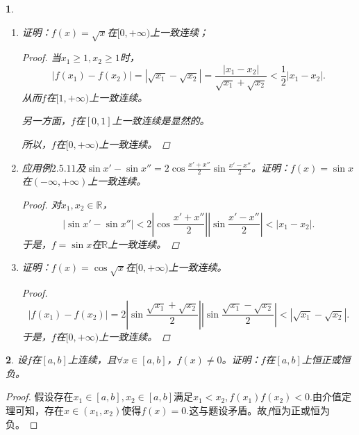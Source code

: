 \documentclass[utf8]{book}
\newtheorem{example}{}[section]             %
\begin{document}
\begin{example}
\renewcommand\labelenumi{\normalfont(\theenumi)}
\begin{enumerate}
\item 证明：$f(x)=\sqrt{x}$在$[0,+\infty)$上一致连续；
\begin{proof}
当$x_1 \geq 1, x_2 \geq 1$时，
$$|f(x_1)-f(x_2)| = |\sqrt{x_1}-\sqrt{x_2}|=\frac{|x_1-x_2|}{\sqrt{x_1}+\sqrt{x_2}} < \frac{1}{2}|x_1-x_2|.$$
从而$f$在$[1, +\infty)$上一致连续。

另一方面，$f$在$[0,1]$上一致连续是显然的。

所以，$f$在$[0,+\infty)$上一致连续。
\end{proof}
\item 应用例$2.5.11$及$\sin{x'}-\sin{x''}=2\cos{\frac{x'+x''}{2}}\sin{\frac{x'-x''}{2}}$。证明：$f(x)=\sin{x}$在$(-\infty,+\infty)$上一致连续。
\begin{proof}
对$x_1, x_2\in \mathbb{R}$，$$|\sin{x'}-\sin{x''}| < 2|\cos{\frac{x'+x''}{2}}||\sin{\frac{x'-x''}{2}}| < |x_1-x_2|.$$
于是，$f=\sin{x}$在$\mathbb{R}$上一致连续。
\end{proof}
\item 证明：$f(x)=\cos{\sqrt{x}}$在$[0,+\infty)$上一致连续。
\begin{proof}
$$|f(x_1) - f(x_2)|= 2|\sin{\frac{\sqrt{x_1}+\sqrt{x_2}}{2}}||\sin{\frac{\sqrt{x_1}-\sqrt{x_2}}{2}}| < |\sqrt{x_1}-\sqrt{x_2}|.$$
于是，$f$在$[0, +\infty)$上一致连续。
\end{proof}
\end{enumerate}
\end{example}
\begin{example}
设$f$在$[a,b]$上连续，且$\forall x\in[a,b]$，$f(x)\neq 0$。证明：$f$在$[a,b]$上恒正或恒负。
\end{example}
\begin{proof}
假设存在$x_1\in[a,b], x_2\in[a,b]$满足$x_1 < x_2, f(x_1)f(x_2) < 0$.由介值定理可知，存在$x\in(x_1, x_2)$使得$f(x) = 0$.这与题设矛盾。故$f$恒为正或恒为负。
\end{proof}
\end{document}
